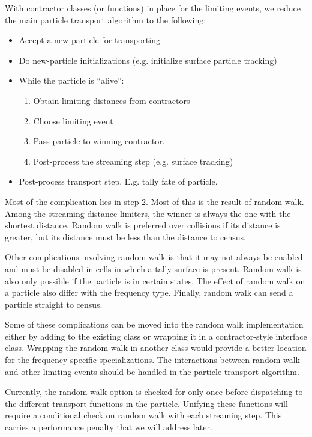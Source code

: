 \documentclass[memo]{ResearchNote}
\begin{document}
With contractor classes (or functions) in place for the limiting
events, we reduce the main particle transport algorithm to the
following:

\begin{itemize}
  \item Accept a new particle for transporting
  \item Do new-particle initializations (e.g. initialize surface
    particle tracking)
  \item While the particle is ``alive'':
    \begin{enumerate}
    \item Obtain limiting distances from contractors
    \item Choose limiting event
    \item Pass particle to winning contractor.
    \item Post-process the streaming step (e.g. surface tracking)
    \end{enumerate}
  \item Post-process transport step. E.g. tally fate of particle.
\end{itemize}

Most of the complication lies in step 2. Most of this is the result of
random walk. Among the streaming-distance limiters, the winner is
always the one with the shortest distance. Random walk is preferred
over collisions if its distance is greater, but its distance must be
less than the distance to census. 

Other complications involving random walk is that it may not always
be enabled and must be disabled in cells in which a tally surface is
present. Random walk is also only possible if the particle is in
certain states. The effect of random walk on a particle also differ
with the frequency type. Finally, random walk can send a particle
straight to census. 

Some of these complications can be moved into the random walk
implementation either by adding to the existing class or wrapping it
in a contractor-style interface class. Wrapping the random walk in
another class would provide a better location for the
frequency-specific specializations. The interactions between random
walk and other limiting events should be handled in the particle
transport algorithm.

Currently, the random walk option is checked for only once before
dispatching to the different transport functions in the particle.
Unifying these functions will require a conditional check on random
walk with each streaming step. This carries a performance penalty that
we will address later.
\end{document}
